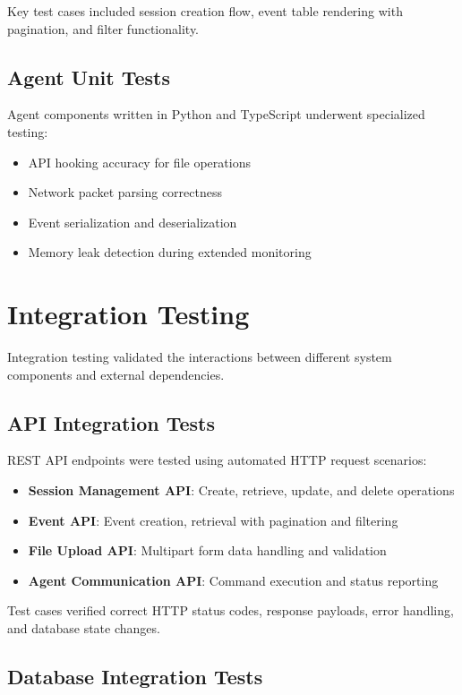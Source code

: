 Key test cases included session creation flow, event table rendering with pagination, and filter functionality.

\subsection{Agent Unit Tests}

Agent components written in Python and TypeScript underwent specialized testing:

\begin{itemize}
    \item API hooking accuracy for file operations
    \item Network packet parsing correctness
    \item Event serialization and deserialization
    \item Memory leak detection during extended monitoring
\end{itemize}

\section{Integration Testing}

Integration testing validated the interactions between different system components and external dependencies.

\subsection{API Integration Tests}

REST API endpoints were tested using automated HTTP request scenarios:

\begin{itemize}
    \item \textbf{Session Management API}: Create, retrieve, update, and delete operations
    \item \textbf{Event API}: Event creation, retrieval with pagination and filtering
    \item \textbf{File Upload API}: Multipart form data handling and validation
    \item \textbf{Agent Communication API}: Command execution and status reporting
\end{itemize}

Test cases verified correct HTTP status codes, response payloads, error handling, and database state changes.

\subsection{Database Integration Tests}

